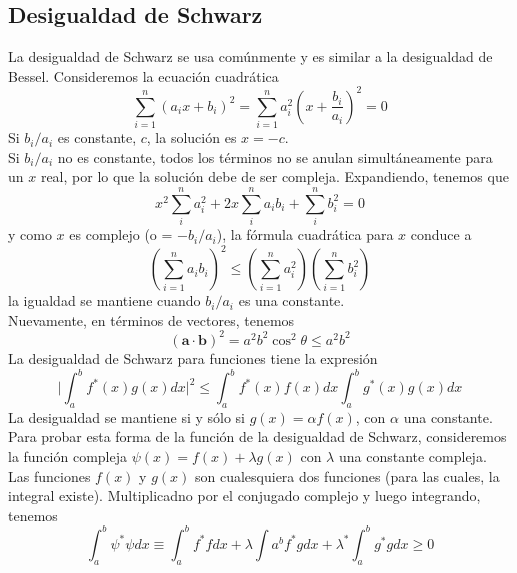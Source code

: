 \subsection{Desigualdad de Schwarz}
La desigualdad de Schwarz se usa comúnmente y es similar a la desigualdad de Bessel. Consideremos la ecuación cuadrática
\begin{equation}
\sum_{i=1}^{n} (a_{i} x + b_{i})^{2} = \sum_{i=1}^{n} a_{i}^{2} \left( x + \frac{b_{i}}{a_{i}} \right)^{2} = 0
\label{eq:ecuacion_73}
\end{equation}
Si $b_{i}/a_{i}$ es constante, $c$, la solución es $x= - c$. 
\\
Si $b_{i}/a_{i}$ no es constante, todos los términos no se anulan simultáneamente para un $x$ real, por lo que la solución debe de ser compleja.
Expandiendo, tenemos que
\begin{equation}
x^{2} \sum_{i}^{n} a_{i}^{2} + 2x \sum_{i}^{n} a_{i} b_{i} + \sum_{i}^{n} b_{i}^{2} = 0
\label{eq:ecuacion_74}
\end{equation}
y como $x$ es complejo (o = $-b_{i}/a_{i}$), la fórmula cuadrática para $x$ conduce a 
\begin{equation}
\left( \sum_{i=1}^{n} a_{i} b_{i} \right)^{2} \leq \left( \sum_{i=1}^{n} a_{i}^{2} \right) \left( \sum_{i=1}^{n} b_{i}^{2} \right)
\label{eq:ecuacion_75}
\end{equation}
la igualdad se mantiene cuando $b_{i}/a_{i}$ es una constante.
\\
Nuevamente, en términos de vectores, tenemos
\begin{equation}
( \mathbf{a} \cdot \mathbf{b} )^{2} =  a^{2} b^{2} \cos^{2} \theta \leq a^{2} b^{2}
\label{eq:ecuacion_76}
\end{equation}
La desigualdad de Schwarz para funciones tiene la expresión
\begin{equation}
\Bigg\vert \int_{a}^{b} f^{*} (x) g(x) dx \Bigg\vert^{2} \leq \int_{a}^{b} f^{*}(x) f(x) dx \int_{a}^{b} g^{*}(x) g(x) dx
\label{eq:ecuacion_77}
\end{equation}
La desigualdad se mantiene si y sólo si $g(x) = \alpha f(x)$, con $\alpha$ una constante. Para probar esta forma de la función de la desigualdad de Schwarz, consideremos la función compleja $\psi(x) = f(x) + \lambda g(x)$ con $\lambda$ una constante compleja.
\\
Las funciones $f(x)$ y $g(x)$ son cualesquiera dos funciones (para las cuales, la integral existe). Multiplicadno por el conjugado complejo y luego integrando, tenemos
\begin{equation}
\int_{a}^{b} \psi^{*} \psi dx \equiv \int_{a}^{b} f^{*} f dx +  \lambda \int{a}^{b} f^{*} g dx + \lambda^{*} \int_{a}^{b} g^{*} g dx \geq 0
\label{eq:ecuacion_78}
\end{equation}
